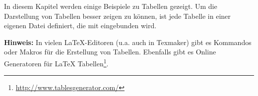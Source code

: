 In diesem Kapitel werden einige Beispiele zu Tabellen gezeigt. Um die Darstellung von Tabellen besser zeigen zu können, ist jede Tabelle in einer eigenen Datei definiert, die mit  eingebunden wird.

\textbf{Hinweis:} In vielen LaTeX-Editoren (u.a. auch in Texmaker) gibt es Kommandos oder Makros für die Erstellung von Tabellen. Ebenfalls gibt es Online Generatoren für LaTeX Tabellen\footnote{\url{http://www.tablesgenerator.com/}}. 
